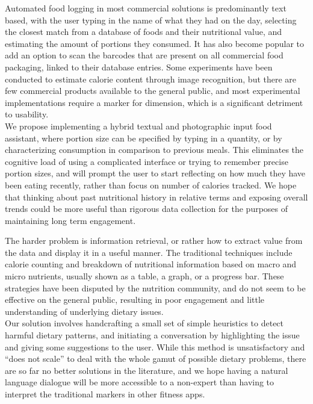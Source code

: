 Automated food logging in most commercial solutions is predominantly text based, with the user typing in the name of what they had on the day, selecting the closest match from a database of foods and their nutritional value, and estimating the amount of portions they consumed. It has also become popular to add an option to scan the barcodes that are present on all commercial food packaging, linked to their database entries. Some experiments have been conducted to estimate calorie content through image recognition, but there are few commercial products available to the general public, and most experimental implementations require a marker for dimension, which is a significant detriment to usability. \\
We propose implementing a hybrid textual and photographic input food assistant, where portion size can be specified by typing in a quantity, or by characterizing consumption in comparison to previous meals. This eliminates the cognitive load of using a complicated interface or trying to remember precise portion sizes, and will prompt the user to start reflecting on how much they have been eating recently, rather than focus on number of calories tracked. We hope that thinking about past nutritional history in relative terms and exposing overall trends could be more useful than rigorous data collection for the purposes of maintaining long term engagement.

The harder problem is information retrieval, or rather how to extract value from the data and display it in a useful manner. The traditional techniques include calorie counting and breakdown of nutritional information based on macro and micro nutrients, usually shown as a table, a graph, or a progress bar. These strategies have been disputed by the nutrition community, and do not seem to be effective on the general public, resulting in poor engagement and little understanding of underlying dietary issues. \\
Our solution involves handcrafting a small set of simple heuristics to detect harmful dietary patterns, and initiating a conversation by highlighting the issue and giving some suggestions to the user. While this method is unsatisfactory and ``does not scale'' to deal with the whole gamut of possible dietary problems, there are so far no better solutions in the literature, and we hope having a natural language dialogue will be more accessible to a non-expert than having to interpret the traditional markers in other fitness apps. 

